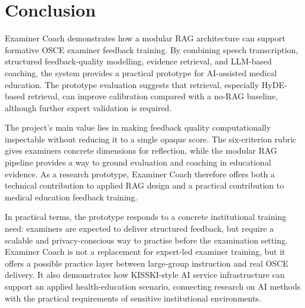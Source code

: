 \section{Conclusion}
Examiner Coach demonstrates how a modular RAG architecture can support formative
OSCE examiner feedback training. By combining speech transcription, structured
feedback-quality modelling, evidence retrieval, and LLM-based coaching, the
system provides a practical prototype for AI-assisted medical education. The
prototype evaluation suggests that retrieval, especially HyDE-based retrieval,
can improve calibration compared with a no-RAG baseline, although further expert
validation is required.

The project's main value lies in making feedback quality computationally
inspectable without reducing it to a single opaque score. The six-criterion
rubric gives examiners concrete dimensions for reflection, while the modular RAG
pipeline provides a way to ground evaluation and coaching in educational
evidence. As a research prototype, Examiner Coach therefore offers both a
technical contribution to applied RAG design and a practical contribution to
medical education feedback training.

In practical terms, the prototype responds to a concrete institutional training
need: examiners are expected to deliver structured feedback, but require a
scalable and privacy-conscious way to practise before the examination setting.
Examiner Coach is not a replacement for expert-led examiner training, but it
offers a possible practice layer between large-group instruction and real OSCE
delivery. It also demonstrates how KISSKI-style AI service infrastructure can
support an applied health-education scenario, connecting research on AI methods
with the practical requirements of sensitive institutional environments.
